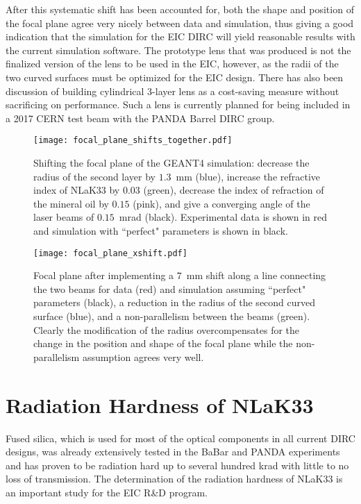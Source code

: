 After this systematic shift has been accounted for, both the shape and position of the focal plane agree very nicely between data and simulation, thus giving a good indication that the simulation for the EIC DIRC will yield reasonable results with the current simulation software. The prototype lens that was produced is not the finalized version of the lens to be used in the EIC, however, as the radii of the two curved surfaces must be optimized for the EIC design. There has also been discussion of building cylindrical 3-layer lens as a cost-saving measure without sacrificing on performance. Such a lens is currently planned for being included in a 2017 CERN test beam with the PANDA Barrel DIRC group.

\begin{figure}[!htb]
	\centering
	\texttt{[image: focal\_plane\_shifts\_together.pdf]}
	\caption{Shifting the focal plane of the GEANT4 simulation: decrease the radius of the second layer by $1.3$~mm (blue), increase the refractive index of NLaK33 by $0.03$ (green), decrease the index of refraction of the mineral oil by $0.15$ (pink), and give a converging angle of the laser beams of $0.15$~mrad (black). Experimental data is shown in red and simulation with ``perfect" parameters is shown in black.}
	\label{fig:focal_plane_shifts}
\end{figure}

\begin{figure}[!htb]
	\centering
	\texttt{[image: focal\_plane\_xshift.pdf]}
	\caption{Focal plane after implementing a $7$~mm shift along a line connecting the two beams for data (red) and simulation assuming ``perfect" parameters (black), a reduction in the radius of the second curved surface (blue), and a non-parallelism between the beams (green). Clearly the modification of the radius overcompensates for the change in the position and shape of the focal plane while the non-parallelism assumption agrees very well.}
	\label{fig:focal_plane_xshift}
\end{figure}


\clearpage
\section{Radiation Hardness of NLaK33}
Fused silica, which is used for most of the optical components in all current DIRC designs, was already extensively tested in the BaBar and PANDA experiments \cite{RadHardness} and has proven to be radiation hard up to several hundred krad with little to no loss of transmission. The determination of the radiation hardness of NLaK33 is an important study for the EIC R\&D program. 

